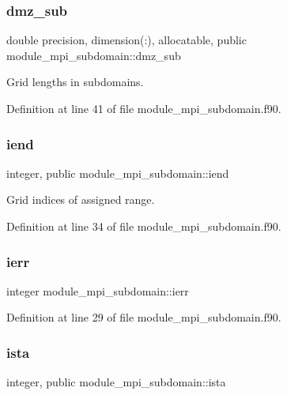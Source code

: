 \subsubsection{\texorpdfstring{dmz\_sub}{dmz\_sub}}
{\footnotesize\ttfamily double precision, dimension(\+:), allocatable, public module\+\_\+mpi\+\_\+subdomain\+::dmz\+\_\+sub}



Grid lengths in subdomains. 



Definition at line 41 of file module\+\_\+mpi\+\_\+subdomain.\+f90.

\mbox{\label{namespacemodule__mpi__subdomain_ac0d40d9eee1ec5249fb230e7d73959d5}} 
\subsubsection{\texorpdfstring{iend}{iend}}
{\footnotesize\ttfamily integer, public module\+\_\+mpi\+\_\+subdomain\+::iend}



Grid indices of assigned range. 



Definition at line 34 of file module\+\_\+mpi\+\_\+subdomain.\+f90.

\mbox{\label{namespacemodule__mpi__subdomain_a180679cc4b2a39351cff87dcca079484}} 
\subsubsection{\texorpdfstring{ierr}{ierr}}
{\footnotesize\ttfamily integer module\+\_\+mpi\+\_\+subdomain\+::ierr}



Definition at line 29 of file module\+\_\+mpi\+\_\+subdomain.\+f90.

\mbox{\label{namespacemodule__mpi__subdomain_a84290c344044aaadb0957d8530f360b6}} 
\subsubsection{\texorpdfstring{ista}{ista}}
{\footnotesize\ttfamily integer, public module\+\_\+mpi\+\_\+subdomain\+::ista}



